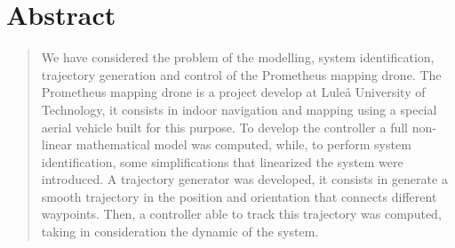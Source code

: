\documentclass[11pt, a4paper, onecolumn, fleqn, twoside, titlepage, openright]{book}
\begin{document}
	\clearpage


	\chapter*{Abstract}
	\label{abstract}

	\begin{quote}
		We have considered the problem of the modelling, system identification, trajectory generation and control of the Prometheus mapping drone. The Prometheus mapping drone is a project develop at Lule\r{a} University of Technology, it consists in indoor navigation and mapping using a special aerial vehicle built for this purpose. To develop the controller a full non-linear mathematical model was computed, while, to perform system identification, some simplifications that linearized the system were introduced. A trajectory generator was developed, it consists in generate a smooth trajectory in the position and orientation that connects different waypoints. Then, a controller able to track this trajectory was computed, taking in consideration the dynamic of the system.
	\end{quote}


	\tableofcontents	


	


	



	



	
\end{document}
